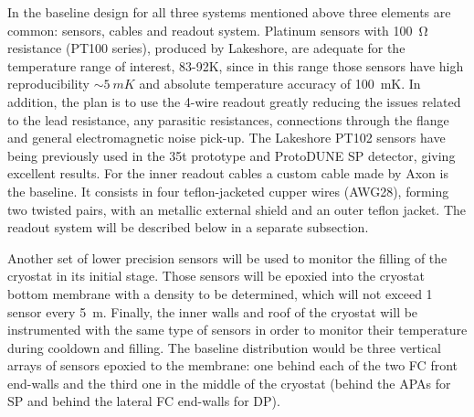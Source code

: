 In the baseline design for all three systems mentioned above three elements are common: sensors, cables and readout system.
Platinum sensors with \SI{100}{\ohm} resistance (PT100 series), produced by Lakeshore,  
are adequate for the temperature range of interest, 83-92\si{K}, since in this range those sensors have high reproducibility 
$\sim\SI{5}{mK}$ and absolute temperature accuracy of \SI{100}{mK}.
In addition, the plan is to use the 4-wire readout greatly reducing the issues related to the lead resistance, any parasitic resistances,
connections through the flange and general electromagnetic noise pick-up. The Lakeshore PT102 sensors
have being previously used in the 35t prototype and ProtoDUNE SP detector,
giving excellent results. For the inner readout cables a custom cable made by Axon is the baseline. It consists in four teflon-jacketed 
cupper wires (AWG28), forming two twisted pairs, with an metallic external shield
and an outer teflon jacket.
The readout system will be described below in a separate subsection. 



Another set of lower precision sensors will be used to monitor the filling of the cryostat in its initial stage. Those sensors will be epoxied into the cryostat bottom membrane with
a density to be determined, which will not exceed 1 sensor every \SI{5}{m}. 
Finally, the inner walls and roof of the cryostat will be instrumented with the same type of sensors in order to monitor their temperature during cooldown and filling.
The baseline distribution would be three vertical arrays of sensors epoxied to the membrane: one behind each of the two FC front end-walls and the third one in the middle of the cryostat
(behind the APAs for SP and behind the lateral FC end-walls for DP). 

